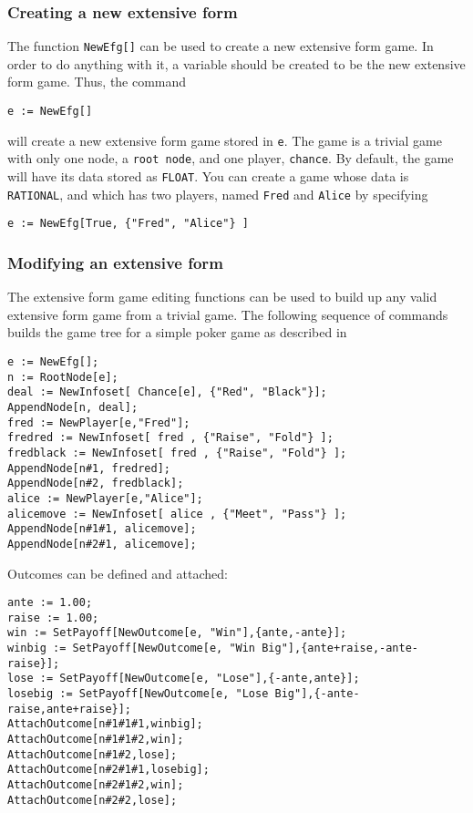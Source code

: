 \subsubsection{Creating a new extensive form}

The function {\tt NewEfg[]} can be used to create a new extensive form game.
In order to do anything with it, a variable should be created to be
the new extensive form game.  Thus, the command

\begin{verbatim}
e := NewEfg[]
\end{verbatim}

\noindent will create a new extensive form game stored in \verb+e+.  The game 
is a trivial game with only one node, a \verb+root node+, and one
player, \verb+chance+.  By default, the game will have its data stored
as \verb+FLOAT+.  You can create a game whose data is \verb+RATIONAL+,
and which has two players, named \verb+Fred+ and \verb+Alice+  by
specifying 


\begin{verbatim}
e := NewEfg[True, {"Fred", "Alice"} ]
\end{verbatim}

\subsubsection{Modifying an extensive form}

The extensive form game editing functions can be used to build up any
valid extensive form game from a trivial game.  The following sequence
of commands builds the game tree for a simple poker game as described
in \cite{Mye:91}

\begin{verbatim}
e := NewEfg[];
n := RootNode[e];
deal := NewInfoset[ Chance[e], {"Red", "Black"}];
AppendNode[n, deal];
fred := NewPlayer[e,"Fred"];
fredred := NewInfoset[ fred , {"Raise", "Fold"} ];
fredblack := NewInfoset[ fred , {"Raise", "Fold"} ];
AppendNode[n#1, fredred];
AppendNode[n#2, fredblack];
alice := NewPlayer[e,"Alice"];
alicemove := NewInfoset[ alice , {"Meet", "Pass"} ];
AppendNode[n#1#1, alicemove]; 
AppendNode[n#2#1, alicemove]; 
\end{verbatim}

\noindent Outcomes can be defined and attached:

\begin{verbatim}
ante := 1.00;
raise := 1.00;
win := SetPayoff[NewOutcome[e, "Win"],{ante,-ante}];
winbig := SetPayoff[NewOutcome[e, "Win Big"],{ante+raise,-ante-raise}];
lose := SetPayoff[NewOutcome[e, "Lose"],{-ante,ante}];
losebig := SetPayoff[NewOutcome[e, "Lose Big"],{-ante-raise,ante+raise}];
AttachOutcome[n#1#1#1,winbig];
AttachOutcome[n#1#1#2,win];
AttachOutcome[n#1#2,lose];
AttachOutcome[n#2#1#1,losebig];
AttachOutcome[n#2#1#2,win];
AttachOutcome[n#2#2,lose];
\end{verbatim}

